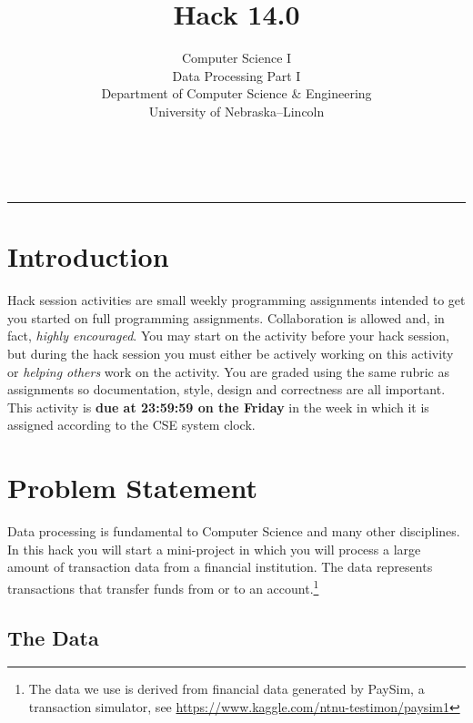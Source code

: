 \documentclass[12pt]{scrartcl}
\title{Hack 14.0}\let\Title\@title
\subtitle{Computer Science I\\
Data Processing Part I\\
{\small
\vskip1cm
Department of Computer Science \& Engineering \\
University of Nebraska--Lincoln}
\vskip-3cm}
\date{~}
\begin{document}
\maketitle

\hrule

\section*{Introduction}

Hack session activities are small weekly programming assignments intended
to get you started on full programming assignments.  Collaboration is allowed
and, in fact, \emph{highly encouraged}.  You may start on the activity before
your hack session, but during the hack session you must either be actively 
working on this activity or \emph{helping others} work on the activity.
You are graded using the same rubric as assignments so documentation, style, 
design and correctness are all important.  This activity is \textbf{due 
at 23:59:59 on the Friday} in the week in which it is assigned according 
to the CSE system clock.

\section*{Problem Statement}


Data processing is fundamental to Computer Science and many other disciplines.
In this hack you will start a mini-project in which you will process a large 
amount of transaction data from a financial institution.  The data represents 
transactions that transfer funds from or to an account.\footnote{The data we 
use is derived from financial data generated by PaySim, a transaction 
simulator, see \url{https://www.kaggle.com/ntnu-testimon/paysim1}}


\subsection*{The Data}
\end{document}
